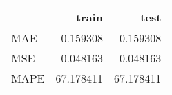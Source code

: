 \begin{tabular}{lrr}
\toprule
{} &      train &       test \\
\midrule
MAE  &   0.159308 &   0.159308 \\
MSE  &   0.048163 &   0.048163 \\
MAPE &  67.178411 &  67.178411 \\
\bottomrule
\end{tabular}
